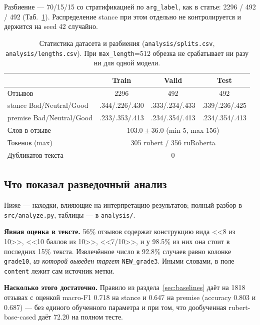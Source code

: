 \documentclass{article}
\begin{document}
Разбиение --- 70/15/15 со стратификацией по \texttt{arg\_label}, как в статье:
2296 / 492 / 492 (Таб.~\ref{tab:statistics}). Распределение stance при этом отдельно
не контролируется и держится на seed 42 случайно.

\begin{table}[tbh!]
\begin{center}
\begin{tabular}[t]{|l|ccc|}
\hline
 & Train & Valid & Test \\
\hline
Отзывов & 2296 & 492 & 492 \\
stance Bad/Neutral/Good & .344/.226/.430 & .333/.234/.433 & .339/.236/.425 \\
premise Bad/Neutral/Good & .233/.353/.413 & .234/.354/.413 & .234/.354/.413 \\
Слов в отзыве & \multicolumn{3}{c|}{$103.0 \pm 36.0$ (min 5, max 156)} \\
Токенов (max) & \multicolumn{3}{c|}{305 rubert / 356 ruRoberta} \\
Дубликатов текста & \multicolumn{3}{c|}{0} \\
\hline
\end{tabular}
\caption{Статистика датасета и разбиения (\texttt{analysis/splits.csv},
\texttt{analysis/lengths.csv}). При \texttt{max\_length}=512 обрезка не срабатывает
ни разу ни для одной модели.}
\label{tab:statistics}
\end{center}
\end{table}

\subsection{Что показал разведочный анализ}
\label{sec:eda}

Ниже --- находки, влияющие на интерпретацию результатов; полный разбор в
\texttt{src/analyze.py}, таблицы --- в \texttt{analysis/}.

\textbf{Явная оценка в тексте.} 56\% отзывов содержат конструкцию вида <<8 из 10>>,
<<10 баллов из 10>>, <<7/10>>, и у 98.5\% из них она стоит в последних 15\% текста.
Извлечённое число в 92.8\% случаев равно колонке \texttt{grade10}, \emph{из которой
выведен таргет} \texttt{NEW\_grade3}. Иными словами, в поле \texttt{content} лежит
сам источник метки.

\textbf{Насколько этого достаточно.} Правило из раздела~\ref{sec:baselines} даёт
на 1818 отзывах с оценкой macro-F1 0.718 на stance и 0.647 на premise
(accuracy 0.803 и 0.687) --- без единого обученного параметра и при том, что
дообученная rubert-base-cased даёт 72.20 на полном тесте.
\end{document}
